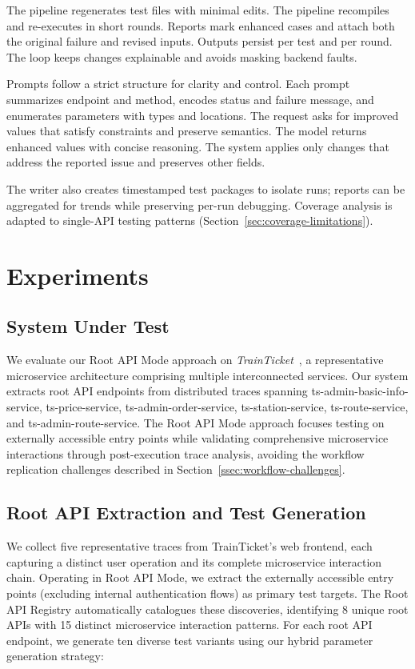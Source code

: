\documentclass[conference]{IEEEtran}
\begin{document}
The pipeline regenerates test files with minimal edits. The pipeline recompiles and re-executes in short rounds. Reports mark enhanced cases and attach both the original failure and revised inputs. Outputs persist per test and per round. The loop keeps changes explainable and avoids masking backend faults.

Prompts follow a strict structure for clarity and control. Each prompt summarizes endpoint and method, encodes status and failure message, and enumerates parameters with types and locations. The request asks for improved values that satisfy constraints and preserve semantics. The model returns enhanced values with concise reasoning. The system applies only changes that address the reported issue and preserves other fields.

\noindent The writer also creates timestamped test packages to isolate runs; reports can be aggregated for trends while preserving per-run debugging. Coverage analysis is adapted to single-API testing patterns (Section~\ref{sec:coverage-limitations}).





\section{Experiments}\label{sec:experiments}

\subsection{System Under Test}
We evaluate our Root API Mode approach on \emph{TrainTicket}~\cite{zhou2018trainticket}, a representative microservice architecture comprising multiple interconnected services. Our system extracts root API endpoints from distributed traces spanning ts-admin-basic-info-service, ts-price-service, ts-admin-order-service, ts-station-service, ts-route-service, and ts-admin-route-service. The Root API Mode approach focuses testing on externally accessible entry points while validating comprehensive microservice interactions through post-execution trace analysis, avoiding the workflow replication challenges described in Section~\ref{ssec:workflow-challenges}.

\subsection{Root API Extraction and Test Generation}
We collect five representative traces from TrainTicket's web frontend, each capturing a distinct user operation and its complete microservice interaction chain. Operating in Root API Mode, we extract the externally accessible entry points (excluding internal authentication flows) as primary test targets. The Root API Registry automatically catalogues these discoveries, identifying 8 unique root APIs with 15 distinct microservice interaction patterns. For each root API endpoint, we generate ten diverse test variants using our hybrid parameter generation strategy:
\end{document}
